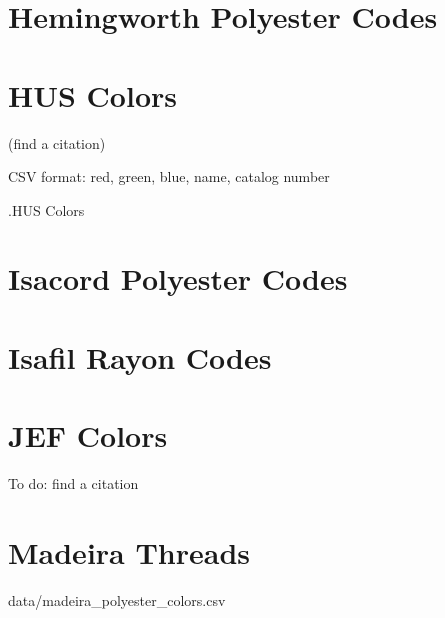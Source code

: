 

\section{Hemingworth Polyester Codes}


\section{HUS Colors}

(find a citation)

CSV format: red, green, blue, name, catalog number

.HUS Colors


\section{Isacord Polyester Codes}


\section{Isafil Rayon Codes}


\section{JEF Colors}

To do: find a citation


\section{Madeira Threads}

{data/madeira_polyester_colors.csv}


